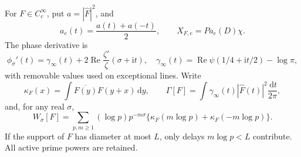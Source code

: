 \documentclass[11pt]{article}
\numberwithin{equation}{section}
\theoremstyle{definition}
\theoremstyle{remark}
\newcommand{\Rea}{\operatorname{Re}}
\newcommand{\ii}{\mathrm i}
\newcommand{\dd}{\,\mathrm d}
\begin{document}
For \(F\in C_c^\infty\), put \(a=|\widehat F|^2\), and
\[
a_e(t)=\frac{a(t)+a(-t)}2,\qquad X_{F,e}=Pa_e(D)\chi.
\]
The phase derivative is
\begin{equation}\label{eq:phase-deriv}
\phi_\sigma'(t)=\gamma_\infty(t)
+2\Rea\frac{\zeta'}{\zeta}(\sigma+\ii t),\quad
\gamma_\infty(t)=\Rea\psi(1/4+\ii t/2)-\log\pi,
\end{equation}
with removable values used on exceptional lines.
Write
\[
\kappa_F(x)=\int\overline{F(y)}F(y+x)\dd y,\qquad
\Gamma[F]=\int\gamma_\infty(t)|\widehat F(t)|^2\frac{\dd t}{2\pi},
\]
and, for any real \(\sigma\),
\begin{equation}\label{eq:W}
W_\sigma[F]=\sum_{p,m\ge1}(\log p)p^{-m\sigma}
\{\kappa_F(m\log p)+\kappa_F(-m\log p)\}.
\end{equation}
If the support of \(F\) has diameter at most \(L\), only delays
\(m\log p<L\) contribute. All active prime powers are retained.
\end{document}
